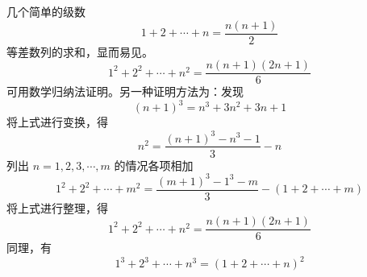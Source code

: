 \documentclass{ctexart}
\begin{document}
几个简单的级数
\begin{equation}
1 + 2 + \cdots + n = \frac{n(n+1)}{2}    
\end{equation}
等差数列的求和，显而易见。
\begin{equation}
1^2 + 2^2 + \cdots + n^2 = \frac{n(n+1)(2n+1)}{6}
\end{equation}
可用数学归纳法证明。另一种证明方法为：发现
\begin{equation}
(n + 1)^3 = n^3 + 3 n^2 + 3 n + 1
\end{equation}
将上式进行变换，得
\begin{equation}
    n^2 = \frac{(n+1)^3 - n^3 -1}{3} - n
\end{equation}
列出 $n = 1,2,3,\cdots, m$ 的情况各项相加
\begin{equation}
1^2 + 2^2 + \cdots + m^2 =
\frac{(m+1)^3 - 1^3 -m}{3} - (1 + 2 + \cdots + m)
\end{equation}
将上式进行整理，得
\begin{equation}
    1^2 + 2^2 + \cdots + n^2 = \frac{n(n+1)(2n+1)}{6}
\end{equation}
同理，有
\begin{equation}
    1^3 + 2^3 + \cdots + n^3 = (1+2+\cdots+n)^2
\end{equation}
\end{document}
